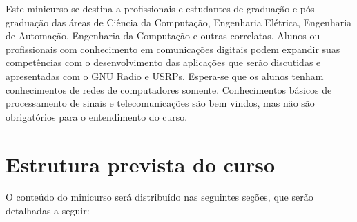 \documentclass{SBCbookchapter}
\begin{document}
Este minicurso se destina a profissionais e estudantes de graduação e pós-graduação das áreas de Ciência da Computação, Engenharia Elétrica, Engenharia de Automação, Engenharia da Computação e outras correlatas. Alunos ou profissionais com conhecimento em comunicações digitais podem expandir suas competências com o desenvolvimento das aplicações que serão discutidas e apresentadas com o GNU Radio e USRPs. Espera-se que os alunos tenham conhecimentos de redes de computadores somente. Conhecimentos básicos de processamento de sinais e telecomunicações são bem vindos, mas não são obrigatórios para o entendimento do curso.


\section{Estrutura prevista do curso}

O conteúdo do minicurso será distribuído nas seguintes seções, que serão detalhadas a seguir:
\end{document}
